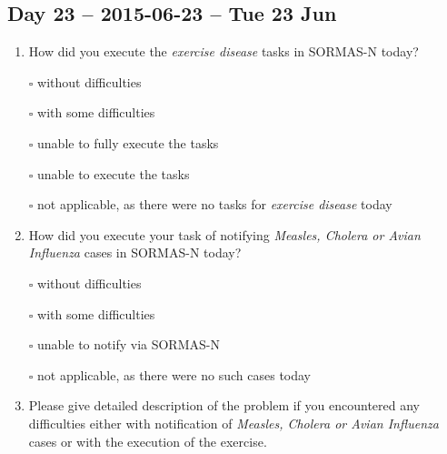 \documentclass[a4paper, titlepage]{tufte-handout}
\begin{document}
\subsection{Day 23 -- 2015-06-23 -- Tue 23 Jun}
\label{sec-8-17}
\begin{enumerate}
\item How did you execute the \emph{exercise disease} tasks in SORMAS-N today?

\quad $\square$ without difficulties

\quad $\square$ with some difficulties

\quad $\square$ unable to fully execute the tasks

\quad $\square$ unable to execute the tasks

\quad $\square$ not applicable, as there were no tasks for \emph{exercise disease} today

\item How did you execute your task of notifying \emph{Measles, Cholera or Avian Influenza} cases in SORMAS-N today?

\quad $\square$ without difficulties

\quad $\square$ with some difficulties

\quad $\square$ unable to notify via SORMAS-N

\quad $\square$ not applicable, as there were no such cases today

\item Please give detailed description of the problem if you encountered any difficulties either with notification of \emph{Measles, Cholera or Avian Influenza} cases or with the execution of the exercise.

\hrulefill

\hrulefill

\hrulefill

\hrulefill

\hrulefill

\hrulefill

\hrulefill

\hrulefill

\hrulefill

\hrulefill
\end{enumerate}

\newpage
\end{document}
